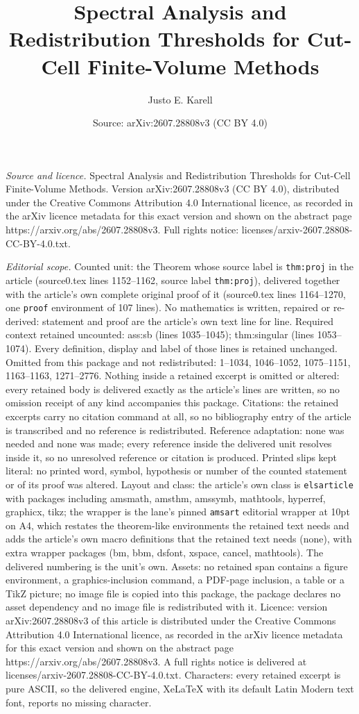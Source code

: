 \documentclass[10pt,a4paper]{amsart}
\title[Spectral Analysis and Redistribution Thresholds for Cut-Cell]{Spectral Analysis and Redistribution Thresholds for Cut-Cell Finite-Volume Methods}
\author{Justo E. Karell}
\date{Source: arXiv:2607.28808v3 (CC BY 4.0)}
\begin{document}
\maketitle

\noindent\emph{Source and licence.} Spectral Analysis and Redistribution Thresholds for Cut-Cell Finite-Volume Methods. Version arXiv:2607.28808v3 (CC BY 4.0), distributed under the Creative Commons Attribution 4.0 International licence, as recorded in the arXiv licence metadata for this exact version and shown on the abstract page https://arxiv.org/abs/2607.28808v3. Full rights notice: licenses/arxiv-2607.28808-CC-BY-4.0.txt.\par\smallskip

\noindent\textit{Editorial scope.} Counted unit: the Theorem whose source label is \texttt{thm:proj} in the article (source0.tex lines 1152--1162, source label \texttt{thm:proj}), delivered together with the article's own complete original proof of it (source0.tex lines 1164--1270, one \texttt{proof} environment of 107 lines). No mathematics is written, repaired or re-derived: statement and proof are the article's own text line for line. Required context retained uncounted: ass:sb (lines 1035--1045); thm:singular (lines 1053--1074). Every definition, display and label of those lines is retained unchanged. Omitted from this package and not redistributed: 1--1034, 1046--1052, 1075--1151, 1163--1163, 1271--2776. Nothing inside a retained excerpt is omitted or altered: every retained body is delivered exactly as the article's lines are written, so no omission receipt of any kind accompanies this package. Citations: the retained excerpts carry no citation command at all, so no bibliography entry of the article is transcribed and no reference is redistributed. Reference adaptation: none was needed and none was made; every reference inside the delivered unit resolves inside it, so no unresolved reference or citation is produced. Printed slips kept literal: no printed word, symbol, hypothesis or number of the counted statement or of its proof was altered. Layout and class: the article's own class is \texttt{elsarticle} with packages including amsmath, amsthm, amssymb, mathtools, hyperref, graphicx, tikz; the wrapper is the lane's pinned \texttt{amsart} editorial wrapper at 10pt on A4, which restates the theorem-like environments the retained text needs and adds the article's own macro definitions that the retained text needs (none), with extra wrapper packages (bm, bbm, dsfont, xspace, cancel, mathtools). The delivered numbering is the unit's own. Assets: no retained span contains a figure environment, a graphics-inclusion command, a PDF-page inclusion, a table or a TikZ picture; no image file is copied into this package, the package declares no asset dependency and no image file is redistributed with it. Licence: version arXiv:2607.28808v3 of this article is distributed under the Creative Commons Attribution 4.0 International licence, as recorded in the arXiv licence metadata for this exact version and shown on the abstract page https://arxiv.org/abs/2607.28808v3. A full rights notice is delivered at licenses/arxiv-2607.28808-CC-BY-4.0.txt. Characters: every retained excerpt is pure ASCII, so the delivered engine, XeLaTeX with its default Latin Modern text font, reports no missing character.
\end{document}
